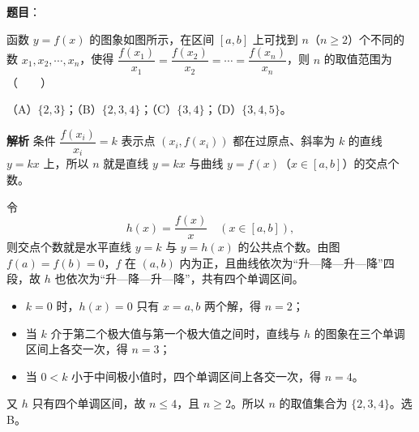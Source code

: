 \begin{answer}

\textbf{题目}：

函数 $y=f(x)$ 的图象如图所示，在区间 $[a,b]$ 上可找到 $n$（$n\geqslant2$）个不同的数 $x_1,x_2,\cdots,x_n$，使得 $\dfrac{f(x_1)}{x_1}=\dfrac{f(x_2)}{x_2}=\cdots=\dfrac{f(x_n)}{x_n}$，则 $n$ 的取值范围为\mbox{（　　）}
\nopagebreak[4]
\begin{center}\end{center}
\nopagebreak[4]
（A）$\{2,3\}$；（B）$\{2,3,4\}$；（C）$\{3,4\}$；（D）$\{3,4,5\}$。

\textbf{解析}
条件 $\dfrac{f(x_i)}{x_i}=k$ 表示点 $(x_i,f(x_i))$ 都在过原点、斜率为 $k$ 的直线 $y=kx$ 上，所以 $n$ 就是直线 $y=kx$ 与曲线 $y=f(x)$（$x\in[a,b]$）的交点个数。

令
\nopagebreak[4]
\[h(x)=\frac{f(x)}{x}\quad(x\in[a,b]),\]
则交点个数就是水平直线 $y=k$ 与 $y=h(x)$ 的公共点个数。由图 $f(a)=f(b)=0$，$f$ 在 $(a,b)$ 内为正，且曲线依次为“升—降—升—降”四段，故 $h$ 也依次为“升—降—升—降”，共有四个单调区间。

\begin{itemize}
\item $k=0$ 时，$h(x)=0$ 只有 $x=a,b$ 两个解，得 $n=2$；
\item 当 $k$ 介于第二个极大值与第一个极大值之间时，直线与 $h$ 的图象在三个单调区间上各交一次，得 $n=3$；
\item 当 $0<k$ 小于中间极小值时，四个单调区间上各交一次，得 $n=4$。
\end{itemize}

又 $h$ 只有四个单调区间，故 $n\leqslant4$，且 $n\geqslant2$。所以 $n$ 的取值集合为 $\{2,3,4\}$。选 B。


\end{answer}
